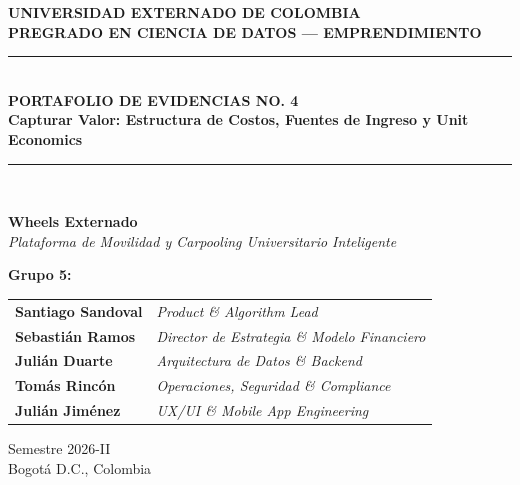 \documentclass[11pt,a4paper]{article}
\begin{document}
\begin{titlepage}
    \centering
    \vspace*{1cm}
    {\Huge \textbf{UNIVERSIDAD EXTERNADO DE COLOMBIA}}\\[0.4cm]
    {\Large \textbf{PREGRADO EN CIENCIA DE DATOS --- EMPRENDIMIENTO}}\\[1.8cm]
    
    \rule{\linewidth}{0.8mm}\\[0.4cm]
    {\Huge \textbf{PORTAFOLIO DE EVIDENCIAS NO. 4}}\\[0.3cm]
    {\Large \textbf{Capturar Valor: Estructura de Costos, Fuentes de Ingreso y Unit Economics}}\\[0.4cm]
    \rule{\linewidth}{0.8mm}\\[1.8cm]
    
    \begin{tcolorbox}[colback=primary!5,colframe=primary]
        \centering \Huge
        \textbf{Wheels Externado} \\[0.2cm]
        \large \textit{Plataforma de Movilidad y Carpooling Universitario Inteligente}
    \end{tcolorbox}
    
    \vspace{2cm}
    
    \textbf{Grupo 5:}\\[0.3cm]
    \begin{tabular}{ll}
        \textbf{Santiago Sandoval} & \textit{Product \& Algorithm Lead} \\
        \textbf{Sebastián Ramos} & \textit{Director de Estrategia \& Modelo Financiero} \\
        \textbf{Julián Duarte} & \textit{Arquitectura de Datos \& Backend} \\
        \textbf{Tomás Rincón} & \textit{Operaciones, Seguridad \& Compliance} \\
        \textbf{Julián Jiménez} & \textit{UX/UI \& Mobile App Engineering} \\
    \end{tabular}
    
    \vfill
    {\large Semestre 2026-II}\\[0.2cm]
    {\normalsize Bogot\'a D.C., Colombia}
\end{titlepage}

\newpage
\tableofcontents
\newpage
\end{document}
